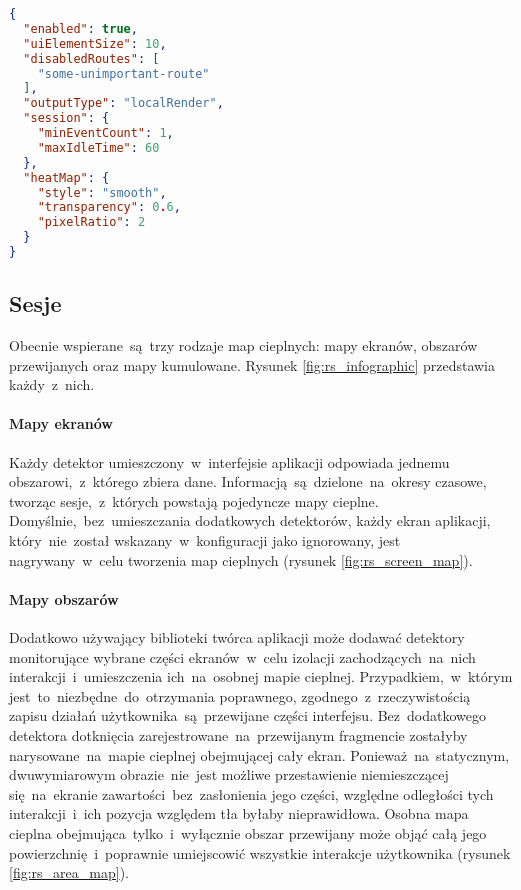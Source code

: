\bigskip
\begin{lstlisting}[language=json,caption={Przykładowy plik konfiguracyjny~w~formacie JSON},label=lst:rs_config_json]
{
  "enabled": true,
  "uiElementSize": 10,
  "disabledRoutes": [
    "some-unimportant-route"
  ],
  "outputType": "localRender",
  "session": {
    "minEventCount": 1,
    "maxIdleTime": 60
  },
  "heatMap": {
    "style": "smooth",
    "transparency": 0.6,
    "pixelRatio": 2
  }
}
\end{lstlisting}

\subsection{Sesje}
Obecnie wspierane~są~trzy rodzaje map cieplnych: mapy ekranów, obszarów przewijanych oraz mapy kumulowane. Rysunek \ref{fig:rs_infographic} przedstawia każdy~z~nich.


\paragraph{Mapy ekranów} Każdy detektor umieszczony~w~interfejsie aplikacji odpowiada jednemu obszarowi,~z~którego zbiera dane. Informacją~są~dzielone~na~okresy czasowe, tworząc sesje,~z~których powstają pojedyncze mapy cieplne. Domyślnie,~bez~umieszczania dodatkowych detektorów, każdy ekran aplikacji, który~nie~został wskazany~w~konfiguracji jako ignorowany, jest nagrywany~w~celu tworzenia map cieplnych (rysunek \ref{fig:rs_screen_map}).


\paragraph{Mapy obszarów} Dodatkowo używający biblioteki twórca aplikacji może dodawać detektory monitorujące wybrane części ekranów~w~celu izolacji zachodzących~na~nich interakcji~i~umieszczenia ich~na~osobnej mapie cieplnej. Przypadkiem,~w~którym jest~to~niezbędne~do~otrzymania poprawnego, zgodnego~z~rzeczywistością zapisu działań użytkownika~są~przewijane części interfejsu. Bez~dodatkowego detektora dotknięcia zarejestrowane~na~przewijanym fragmencie zostałyby narysowane~na~mapie cieplnej obejmującej cały ekran. Ponieważ~na~statycznym, dwuwymiarowym obrazie~nie~jest możliwe przestawienie niemieszczącej się~na~ekranie zawartości~bez~zasłonienia jego części, względne odległości tych interakcji~i~ich pozycja względem tła byłaby nieprawidłowa. Osobna mapa cieplna obejmująca~tylko~i~wyłącznie obszar przewijany może objąć całą jego powierzchnię~i~poprawnie umiejscowić wszystkie interakcje użytkownika (rysunek \ref{fig:rs_area_map}).

